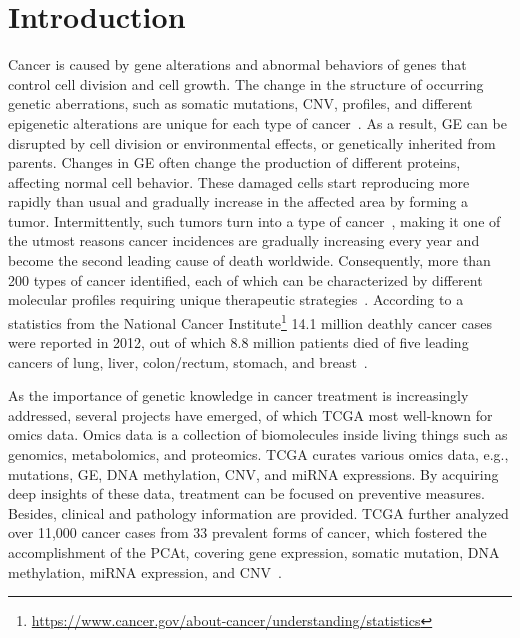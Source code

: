 \section{Introduction}\label{chapter_5:intro}
Cancer is caused by gene alterations and abnormal behaviors of genes that control cell division and cell growth. The change in the structure of occurring genetic aberrations, such as somatic mutations, CNV, profiles, and different epigenetic alterations are unique for each type of cancer~\cite{82Tomczak,19Cruz}. As a result, GE can be disrupted by cell division or environmental effects, or genetically inherited from parents. Changes in GE often change the production of different proteins, affecting normal cell behavior. These damaged cells start reproducing more rapidly than usual and gradually increase in the affected area by forming a tumor. Intermittently, such tumors turn into a type of cancer~\cite{zuo2019identification,24Podolsky}, making it one of the utmost reasons cancer incidences are gradually increasing every year and become the second leading cause of death worldwide. Consequently, more than 200 types of cancer identified, each of which can be characterized by different molecular profiles requiring unique therapeutic strategies~\cite{82Tomczak}. According to a statistics from the National Cancer Institute\footnote{\url{https://www.cancer.gov/about-cancer/understanding/statistics}} 14.1 million deathly cancer cases were reported in 2012, out of which 8.8 million patients died of five leading cancers of lung, liver, colon/rectum, stomach, and breast~\cite{zuo2019identification}. 

\hspace*{3.5mm} As the importance of genetic knowledge in cancer treatment is increasingly addressed, several projects have emerged, of which TCGA most well-known for omics data. Omics data is a collection of biomolecules inside living things such as genomics, metabolomics, and proteomics. TCGA curates various omics data, e.g., mutations, GE, DNA methylation, CNV, and miRNA expressions. By acquiring deep insights of these data, treatment can be focused on preventive measures. Besides, clinical and pathology information are provided. TCGA further analyzed over 11,000 cancer cases from 33 prevalent forms of cancer, which fostered the accomplishment of the PCAt, covering gene expression, somatic mutation, DNA methylation, miRNA expression, and CNV~\cite{lyu2018deep}. 

